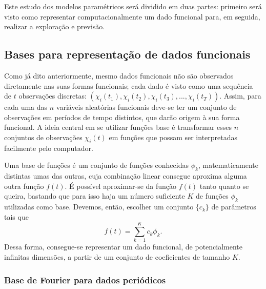\documentclass[
	12pt,				%
	openright,			%
	oneside,			%
	a4paper,			%
	english,			%
	brazil				%
	]{dissertacao-ufrgs-abntex2}
\begin{document}
Este estudo dos modelos paramétricos será dividido em duas partes:
primeiro será visto como representar computacionalmente um dado funcional
para, em seguida, realizar a exploração e previsão.


\subsection{Bases para representação
de dados funcionais} \label{sub:Bases-para-representa}

Como já dito anteriormente, mesmo dados funcionais não são observados
diretamente nas suas formas funcionais; cada dado é visto como uma
sequência de $t$ observações discretas: $(\chi_{i}(t_{1}),\chi_{i}(t_{2}),\chi_{i}(t_{3}),...,\chi_{i}(t_{T}))$.
Assim, para cada uma das $n$ variáveis aleatórias funcionais deve-se
ter um conjunto de observações em períodos de tempo distintos, que
darão origem à sua forma funcional. A ideia central em se utilizar
funções base é transformar esses $n$ conjuntos de observações $\chi_{i}(t)$
em funções que possam ser interpretadas facilmente pelo computador.

Uma base de funções é um conjunto de funções conhecidas $\phi_{k}$,
matematicamente distintas umas das outras, cuja combinação linear
consegue aproxima alguma outra função $f(t)$. É possível aproximar-se da função $f(t)$ tanto quanto se queira, bastando que
para isso haja um número suficiente $K$ de funções $\phi_{k}$ utilizadas
como base. Devemos, então, escolher um conjunto $\{c_{k}\}$ de parâmetros
tais que
\begin{equation}
f(t)=\sum_{k=1}^{K}c_{k}\phi_{k}.
\end{equation}
Dessa forma, consegue-se representar um dado funcional, de potencialmente
infinitas dimensões, a partir de um conjunto de coeficientes de tamanho
$K$. 

\subsubsection*{Base de Fourier para dados periódicos}
\end{document}
